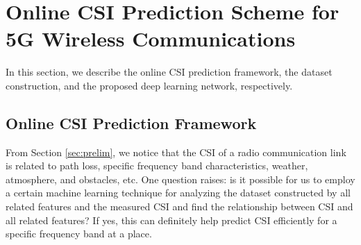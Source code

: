 \documentclass[10pt,journal,cspaper,compsoc]{IEEEtran}
\begin{document}

\section{Online CSI Prediction Scheme for 5G Wireless Communications}
\label{sec:csi-prediction}

In this section, we describe the online CSI prediction framework, the dataset construction, and the proposed deep learning network, respectively.

\subsection{Online CSI Prediction Framework}
\label{subsec:learning-frame}

From Section \ref{sec:prelim}, we notice that the CSI of a radio communication link is related to path loss, specific frequency band characteristics, weather, atmosphere, and obstacles, etc. One question raises: is it possible for us to employ a certain machine learning technique for analyzing the dataset constructed by all related features and the measured CSI and find the relationship between CSI and all related features? If yes, this can definitely help predict CSI efficiently for a specific frequency band at a place.
\end{document}
